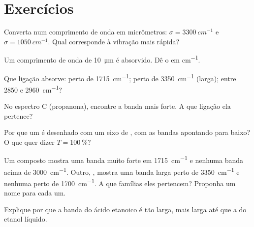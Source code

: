 \section{Exercícios}

\begin{exercise}[$\star$]\label{exo:g11:infrared:1}
Converta num comprimento de onda em micrômetros:
$\sigma = \qty{3300}{cm^{-1}}$
e $\sigma = \qty{1050}{cm^{-1}}$. Qual corresponde à vibração mais
rápida?
\end{exercise}

\begin{exercise}[$\star$]\label{exo:g11:infrared:2}
Um comprimento de onda de \qty{10}{\micro m} é absorvido. Dê o  em \si{cm^{-1}}.
\end{exercise}

\begin{exercise}[$\star$]\label{exo:g11:infrared:3}
Que ligação absorve: perto de \qty{1715}{cm^{-1}}; perto de
\qty{3350}{cm^{-1}} (larga); entre 2850 e \qty{2960}{cm^{-1}}?
\end{exercise}

\begin{exercise}[$\star$]\label{exo:g11:infrared:4}
No espectro C (propanona), encontre a banda mais forte. A que ligação
ela pertence?
\end{exercise}

\begin{exercise}[$\star$]\label{exo:g11:infrared:5}
Por que um  é desenhado com um eixo de
, com as bandas apontando para baixo? O que quer dizer
$T = \qty{100}{\percent}$?
\end{exercise}

\begin{exercise}[$\star\star$]\label{exo:g11:infrared:6}
Um composto  mostra uma banda muito forte em
\qty{1715}{cm^{-1}} e nenhuma banda acima de \qty{3000}{cm^{-1}}. Outro,
, mostra uma banda larga perto de \qty{3350}{cm^{-1}} e
nenhuma perto de \qty{1700}{cm^{-1}}. A que famílias eles pertencem?
Proponha um nome para cada um.
\end{exercise}

\begin{exercise}[$\star\star$]\label{exo:g11:infrared:7}
Explique por que a banda  do ácido etanoico é tão larga, mais
larga até que a do etanol líquido.
\end{exercise}

